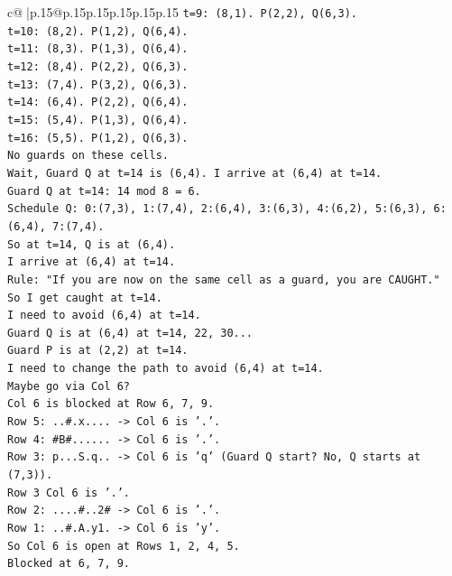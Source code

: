 \documentclass{article}
\begin{document}
{\begin{supertabular}{c@{$\;$}|p{.15\linewidth}@{}p{.15\linewidth}p{.15\linewidth}p{.15\linewidth}p{.15\linewidth}p{.15\linewidth}}
{{{\texttt{t=9: (8,1). P(2,2), Q(6,3).} \\
\texttt{t=10: (8,2). P(1,2), Q(6,4).} \\
\texttt{t=11: (8,3). P(1,3), Q(6,4).} \\
\texttt{t=12: (8,4). P(2,2), Q(6,3).} \\
\texttt{t=13: (7,4). P(3,2), Q(6,3).} \\
\texttt{t=14: (6,4). P(2,2), Q(6,4).} \\
\texttt{t=15: (5,4). P(1,3), Q(6,4).} \\
\texttt{t=16: (5,5). P(1,2), Q(6,3).} \\
\texttt{No guards on these cells.} \\
\texttt{Wait, Guard Q at t=14 is (6,4). I arrive at (6,4) at t=14.} \\
\texttt{Guard Q at t=14: 14 mod 8 = 6.} \\
\texttt{Schedule Q: 0:(7,3), 1:(7,4), 2:(6,4), 3:(6,3), 4:(6,2), 5:(6,3), 6:(6,4), 7:(7,4).} \\
\texttt{So at t=14, Q is at (6,4).} \\
\texttt{I arrive at (6,4) at t=14.} \\
\texttt{Rule: "If you are now on the same cell as a guard, you are CAUGHT."} \\
\texttt{So I get caught at t=14.} \\
\texttt{I need to avoid (6,4) at t=14.} \\
\texttt{Guard Q is at (6,4) at t=14, 22, 30...} \\
\texttt{Guard P is at (2,2) at t=14.} \\
\texttt{I need to change the path to avoid (6,4) at t=14.} \\
\texttt{Maybe go via Col 6?} \\
\texttt{Col 6 is blocked at Row 6, 7, 9.} \\
\texttt{Row 5: ..\#.x.... {-}> Col 6 is '.'.} \\
\texttt{Row 4: \#B\#...... {-}> Col 6 is '.'.} \\
\texttt{Row 3: p...S.q.. {-}> Col 6 is 'q' (Guard Q start? No, Q starts at (7,3)).} \\
\texttt{Row 3 Col 6 is '.'.} \\
\texttt{Row 2: ....\#..2\# {-}> Col 6 is '.'.} \\
\texttt{Row 1: ..\#.A.y1. {-}> Col 6 is 'y'.} \\
\texttt{So Col 6 is open at Rows 1, 2, 4, 5.} \\
\texttt{Blocked at 6, 7, 9.} \\
}}}
\end{supertabular}}
\end{document}
